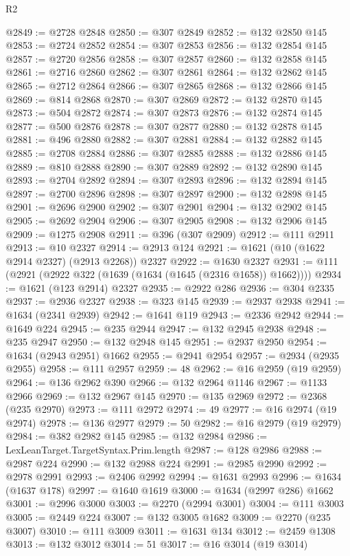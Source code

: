 \begin{lexlean}{R2}
\begin{coremodule}
@2849 := @2728 @2848
@2850 := @307 @2849
@2852 := @132 @2850 @145
@2853 := @2724 @2852
@2854 := @307 @2853
@2856 := @132 @2854 @145
@2857 := @2720 @2856
@2858 := @307 @2857
@2860 := @132 @2858 @145
@2861 := @2716 @2860
@2862 := @307 @2861
@2864 := @132 @2862 @145
@2865 := @2712 @2864
@2866 := @307 @2865
@2868 := @132 @2866 @145
@2869 := @814 @2868
@2870 := @307 @2869
@2872 := @132 @2870 @145
@2873 := @504 @2872
@2874 := @307 @2873
@2876 := @132 @2874 @145
@2877 := @500 @2876
@2878 := @307 @2877
@2880 := @132 @2878 @145
@2881 := @496 @2880
@2882 := @307 @2881
@2884 := @132 @2882 @145
@2885 := @2708 @2884
@2886 := @307 @2885
@2888 := @132 @2886 @145
@2889 := @810 @2888
@2890 := @307 @2889
@2892 := @132 @2890 @145
@2893 := @2704 @2892
@2894 := @307 @2893
@2896 := @132 @2894 @145
@2897 := @2700 @2896
@2898 := @307 @2897
@2900 := @132 @2898 @145
@2901 := @2696 @2900
@2902 := @307 @2901
@2904 := @132 @2902 @145
@2905 := @2692 @2904
@2906 := @307 @2905
@2908 := @132 @2906 @145
@2909 := @1275 @2908
@2911 := @396 (@307 @2909)
@2912 := @111 @2911
@2913 := @10 @2327
@2914 := @2913 @124
@2921 := @1621 (@10 (@1622 @2914 @2327) (@2913 @2268)) @2327
@2922 := @1630 @2327
@2931 := @111 (@2921 (@2922 @322 (@1639 (@1634 (@1645 (@2316 @1658)) @1662))))
@2934 := @1621 (@123 @2914) @2327
@2935 := @2922 @286
@2936 := @304 @2335
@2937 := @2936 @2327
@2938 := @323 @145
@2939 := @2937 @2938
@2941 := @1634 (@2341 @2939)
@2942 := @1641 @119
@2943 := @2336 @2942
@2944 := @1649 @224
@2945 := @235 @2944
@2947 := @132 @2945 @2938
@2948 := @235 @2947
@2950 := @132 @2948 @145
@2951 := @2937 @2950
@2954 := @1634 (@2943 @2951) @1662
@2955 := @2941 @2954
@2957 := @2934 (@2935 @2955)
@2958 := @111 @2957
@2959 := 48
@2962 := @16 @2959 (@19 @2959)
@2964 := @136 @2962 @390
@2966 := @132 @2964 @1146
@2967 := @1133 @2966
@2969 := @132 @2967 @145
@2970 := @135 @2969
@2972 := @2368 (@235 @2970)
@2973 := @111 @2972
@2974 := 49
@2977 := @16 @2974 (@19 @2974)
@2978 := @136 @2977
@2979 := 50
@2982 := @16 @2979 (@19 @2979)
@2984 := @382 @2982 @145
@2985 := @132 @2984
@2986 := LexLeanTarget.TargetSyntax.Prim.length
@2987 := @128 @2986
@2988 := @2987 @224
@2990 := @132 @2988 @224
@2991 := @2985 @2990
@2992 := @2978 @2991
@2993 := @2406 @2992
@2994 := @1631 @2993
@2996 := @1634 (@1637 @178)
@2997 := @1640 @1619
@3000 := @1634 (@2997 @286) @1662
@3001 := @2996 @3000
@3003 := @2270 (@2994 @3001)
@3004 := @111 @3003
@3005 := @2449 @224
@3007 := @132 @3005 @1682
@3009 := @2270 (@235 @3007)
@3010 := @111 @3009
@3011 := @1631 @134
@3012 := @2459 @1308
@3013 := @132 @3012
@3014 := 51
@3017 := @16 @3014 (@19 @3014)

\end{coremodule}
\end{lexlean}
